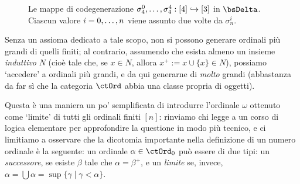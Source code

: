 \begin{figure}
\begin{center}
	\end{center}
	\caption{Le mappe di codegenerazione \(\sigma_4^0,\dots,\sigma_4^4 : [4]\hookrightarrow [3]\) in \(\bsDelta\). Ciascun valore \(i=\iter[0] n\) viene assunto due volte da \(\sigma_n^i\).}
	\label{fig:cofa}
\end{figure}
\begin{remark}
	Senza un assioma dedicato a tale scopo, non si possono generare ordinali più grandi di quelli finiti; al contrario, assumendo che esista almeno un insieme \emph{induttivo} \(N\) (cioè tale che, se \(x\in N\), allora \(x^+:=x\cup\{x\}\in N\)), possiamo `accedere' a ordinali più grandi, e da qui generarne di \emph{molto} grandi (abbastanza da far sì che la categoria \(\ctOrd\) abbia una classe propria di oggetti).

	Questa è una maniera un po' semplificata di introdurre l'ordinale \(\omega\) ottenuto come `limite' di tutti gli ordinali finiti \([n]\): rinviamo chi legge a un corso di logica elementare per approfondire la questione in modo più tecnico, e ci limitiamo a osservare che la dicotomia importante nella definizione di un numero ordinale è la seguente: un ordinale \(\alpha\in\ctOrd_0\) può essere di due tipi: un \emph{successore}, se esiste \(\beta\) tale che \(\alpha=\beta^+\), e un \emph{limite} se, invece, \(\alpha=\bigcup\alpha=\sup\{\gamma\mid \gamma < \alpha\}\).
\end{remark}
